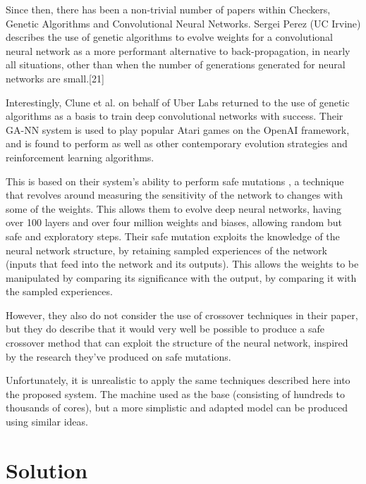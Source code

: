 \documentclass[12pt,a4paper]{article}
\begin{document}
        Since then, there has been a non-trivial number of papers within Checkers, Genetic Algorithms and Convolutional Neural Networks. Sergei Perez (UC Irvine) describes the use of genetic algorithms to evolve weights for a convolutional neural network as a more performant alternative to back-propagation, in nearly all situations, other than when the number of generations generated for neural networks are small.[21]

        Interestingly, Clune et al. on behalf of Uber Labs returned to the use of genetic algorithms as a basis to train deep convolutional networks with success. \cite{such_deep_2017} Their GA-NN system is used to play popular Atari games on the OpenAI framework, and is found to perform as well as other contemporary evolution strategies and reinforcement learning algorithms. 

        This is based on their system's ability to perform safe mutations \cite{lehman_safe_2017}, a technique that revolves around measuring the sensitivity of the network to changes with some of the weights. This allows them to evolve deep neural networks, having over 100 layers and over four million weights and biases, allowing random but safe and exploratory steps. Their safe mutation exploits the knowledge of the neural network structure, by retaining sampled experiences of the network (inputs that feed into the network and its outputs). This allows the weights to be manipulated by comparing its significance with the output, by comparing it with the sampled experiences. 

        However, they also do not consider the use of crossover techniques in their paper, but they do describe that it would very well be possible to produce a safe crossover method that can exploit the structure of the neural network, inspired by the research they've produced on safe mutations.

        Unfortunately, it is unrealistic to apply the same techniques described here into the proposed system. The machine used as the base (consisting of hundreds to thousands of cores), but a more simplistic and adapted model can be produced using similar ideas. 

\section{Solution}

\end{document}
